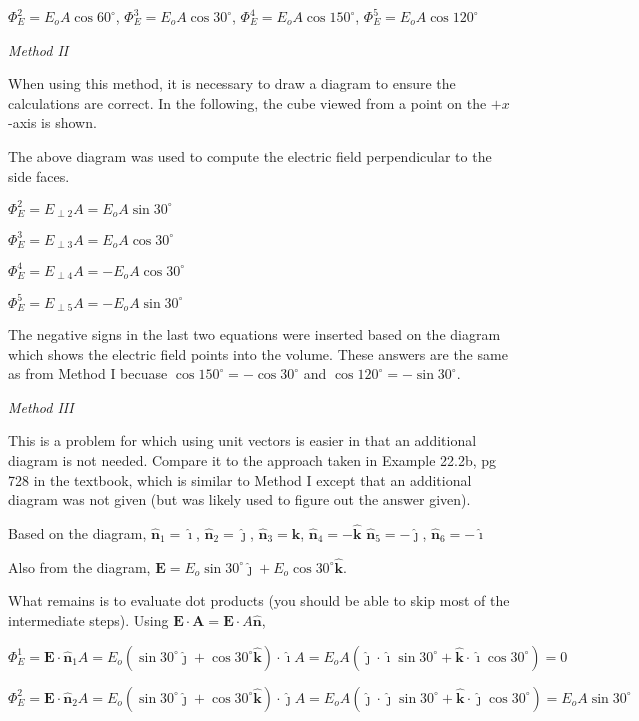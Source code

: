 \documentclass{article}
\newcommand{\ihat}[0]{\hat{\boldsymbol{\imath}}}
\newcommand{\jhat}[0]{\hat{\boldsymbol{\jmath}}}
\newcommand{\khat}[0]{\hat{\boldsymbol{k}}}
\begin{document}
$\Phi_E^2=E_oA\cos 60^\circ$, $\Phi_E^3=E_oA\cos 30^\circ$, $\Phi_E^4=E_oA\cos 150^\circ$, $\Phi_E^5=E_oA\cos 120^\circ$

\emph{Method II}

When using this method, it is necessary to draw a diagram to ensure the calculations are correct. In the following, the cube viewed from a point on the $+x$-axis is shown.



The above diagram was used to compute the electric field perpendicular to the side faces.

$\Phi_E^2=E_{\perp 2}A=E_oA\sin 30^\circ$

$\Phi_E^3=E_{\perp 3}A=E_oA\cos 30^\circ$

$\Phi_E^4=E_{\perp 4}A=-E_oA\cos 30^\circ$

$\Phi_E^5=E_{\perp 5}A=-E_oA\sin 30^\circ$

The negative signs in the last two equations were inserted based on the diagram which shows the electric field points into the volume. These answers are the same as from Method I becuase $\cos 150^\circ = -\cos 30^\circ$ and $\cos 120^\circ = -\sin 30^\circ$.

\emph{Method III}

This is a problem for which using unit vectors is easier in that an additional diagram is not needed. Compare it to the approach taken in Example 22.2b, pg 728 in the textbook, which is similar to Method I except that an additional diagram was not given (but was likely used to figure out the answer given).

Based on the diagram, $\hat{\mathbf{n}}_1=\ihat$, $\hat{\mathbf{n}}_2=\jhat$, $\hat{\mathbf{n}}_3=\khat$, $\hat{\mathbf{n}}_4=-\khat$
$\hat{\mathbf{n}}_5=-\jhat$, $\hat{\mathbf{n}}_6=-\ihat$

Also from the diagram, $\mathbf{E}=E_o\sin30^\circ\jhat+E_o\cos30^\circ\khat$.

What remains is to evaluate dot products (you should be able to skip most of the intermediate steps). Using $\mathbf{E}\cdot\mathbf{A}=\mathbf{E}\cdot A\hat{\mathbf{n}}$,

$$\Phi_E^1=\mathbf{E}\cdot \hat{\mathbf{n}}_1A=E_o(\sin 30^\circ\jhat+\cos 30^\circ\khat)\cdot\ihat A = E_oA(\jhat\cdot\ihat\sin 30^\circ+\khat\cdot\ihat\cos 30^\circ)=0$$

$$\Phi_E^2=\mathbf{E}\cdot \hat{\mathbf{n}}_2A=E_o(\sin 30^\circ\jhat+\cos 30^\circ\khat)\cdot\jhat A = E_oA(\jhat\cdot\jhat\sin 30^\circ+\khat\cdot\jhat\cos 30^\circ)=E_oA\sin 30^\circ$$
\end{document}
